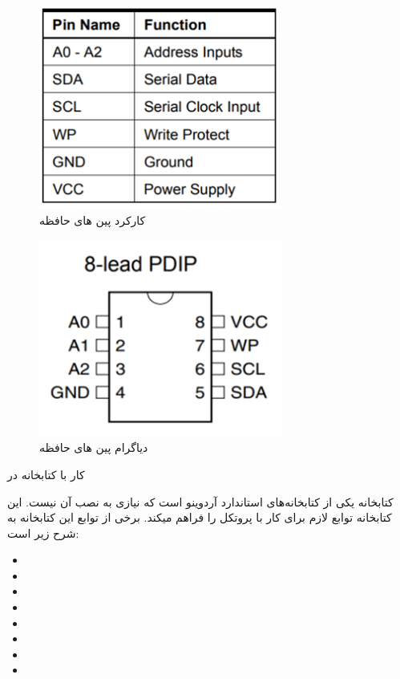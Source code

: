 \newline
\begin{figure}[h]
    \centering
    \includegraphics[width=8cm]{eeprom-pindesc.png}
    \caption{کارکرد پین های حافظه}
    \label{fig:eeprom-pindesc}
\end{figure}

\begin{figure}[h]
    \centering
    \includegraphics[width=8cm]{eeprom-pinout.png}
    \caption{دیاگرام پین های حافظه}
    \label{fig:eeprom-pinout}
\end{figure}
\newline

\begin{nas} کار با کتابخانه  در  \end{nas}
\newline

کتابخانه 
یکی از کتابخانه‌های استاندارد آردوینو است که نیازی به نصب آن نیست. این کتابخانه توابع لازم برای کار با پروتکل  را فراهم میکند. برخی از توابع این کتابخانه به شرح زیر است:
\begin{itemize}
    \item {}
    \item {}
    \item {}
    \item {}
    \item {}
    \item {}
    \item {}
    \item {}
\end{itemize}

